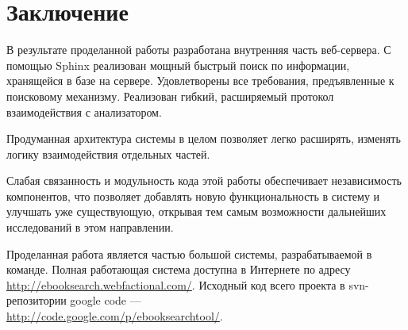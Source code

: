 \section{Заключение}
В результате проделанной работы разработана внутренняя часть веб-сервера.
С помощью Sphinx реализован мощный быстрый поиск по информации, хранящейся в базе на сервере.
Удовлетворены все требования, предъявленные к поисковому механизму.
Реализован гибкий, расширяемый протокол взаимодействия с анализатором.

Продуманная архитектура системы в целом позволяет легко расширять, изменять логику взаимодействия отдельных частей.

Слабая связанность и модульность кода этой работы обеспечивает независимость компонентов, что позволяет добавлять новую функциональность в систему и улучшать уже существующую,
открывая тем самым возможности дальнейших исследований в этом направлении.

Проделанная работа является частью большой системы, разрабатываемой в команде.
Полная работающая система доступна в Интернете по адресу \url{http://ebooksearch.webfactional.com/}.
Исходный код всего проекта в svn-репозитории google code ---\\ 
\url{http://code.google.com/p/ebooksearchtool/}.
